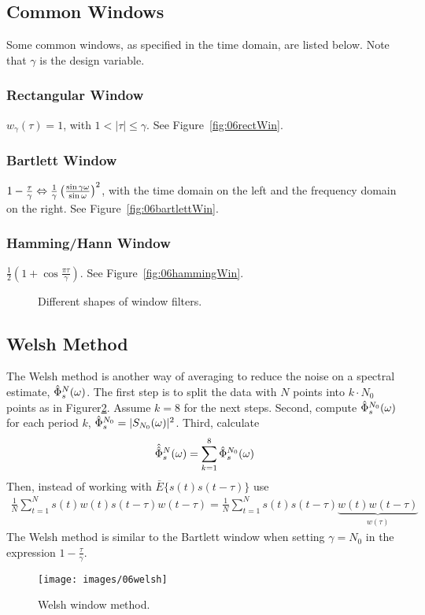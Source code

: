 \subsection{Common Windows}
Some common windows, as specified in the time domain, are listed below.
Note that $\gamma$ is the design variable.

\subsubsection{Rectangular Window}
$w_\gamma(\tau) = 1$, with $1<|\tau|\leq\gamma$.
See Figure~\ref{fig:06rectWin}.

\subsubsection{Bartlett Window}
$1-\frac{\tau}{\gamma} \Leftrightarrow \frac{1}{\gamma}\left(\frac{\sin\gamma\omega}{\sin\omega}\right)^2$, with the time domain on the left and the frequency domain on the right.%
See Figure~\ref{fig:06bartlettWin}.

\subsubsection{Hamming/Hann Window}
$\frac{1}{2}\left(1+\cos\frac{\pi\tau}{\gamma}\right)$.
See Figure~\ref{fig:06hammingWin}.

\begin{figure}[ht!]
\centering
{}\hfill
{}\hfill
{}
\caption{Different shapes of window filters.}
\label{fig:06filterShapes}
\end{figure}

\subsection{Welsh Method}
The Welsh method is another way of averaging to reduce the noise on a spectral estimate, $\hat{\Phi}_s^N(\omega)$.
The first step is to split the data with $N$ points into $k\cdot N_0$ points as in Figurer\ref{fig:06welsh}.
Assume $k=8$ for the next steps.
Second, compute $\hat{\Phi}_s^{N_0}(\omega)$ for each period $k$, $\hat{\Phi}_s^{N_0} = |S_{N_0}(\omega)|^2$.
Third, calculate
$$\hat{\hat{\Phi}}_s^N(\omega) = \sum_{k=1}^8 \hat{\Phi}_s^{N_0}(\omega)$$
Then, instead of working with $\bar{E}\{s(t)s(t-\tau)\}$ use
\begin{align*}
\frac{1}{N}\sum_{t=1}^N s(t)w(t)s(t-\tau)w(t-\tau) =
\frac{1}{N}\sum_{t=1}^N s(t)s(t-\tau) \underbrace{w(t)w(t-\tau)}_{w(\tau)}
\end{align*}
The Welsh method is similar to the Bartlett window when setting $\gamma=N_0$ in the expression $1-\frac{\tau}{\gamma}$.

\begin{figure}[ht!]
\centering
\texttt{[image: images/06welsh]}
\caption{Welsh window method.}
\label{fig:06welsh}
\end{figure}

